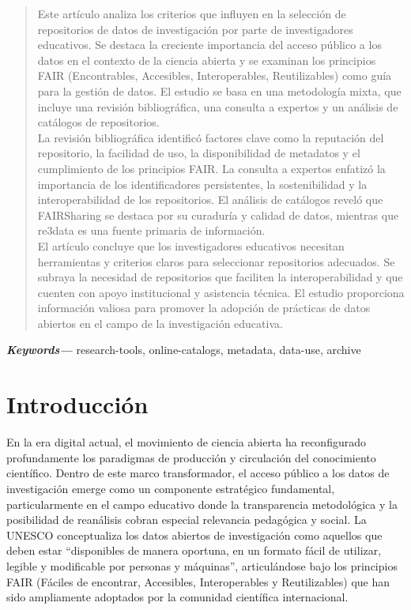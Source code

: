 \documentclass{article}
\providecommand{\keywords}[1]
{
  \small	
  \textbf{\textit{Keywords---}} #1
}
\begin{document}
\begin{abstract}
Este artículo analiza los criterios que influyen en la selección de repositorios de datos de investigación por parte de investigadores educativos. Se destaca la creciente importancia del acceso público a los datos en el contexto de la ciencia abierta y se examinan los principios FAIR (Encontrables, Accesibles, Interoperables, Reutilizables) como guía para la gestión de datos. El estudio se basa en una metodología mixta, que incluye una revisión bibliográfica, una consulta a expertos y un análisis de catálogos de repositorios.\\

La revisión bibliográfica identificó factores clave como la reputación del repositorio, la facilidad de uso, la disponibilidad de metadatos y el cumplimiento de los principios FAIR. La consulta a expertos enfatizó la importancia de los identificadores persistentes, la sostenibilidad y la interoperabilidad de los repositorios. El análisis de catálogos reveló que FAIRSharing se destaca por su curaduría y calidad de datos, mientras que re3data es una fuente primaria de información.\\

El artículo concluye que los investigadores educativos necesitan herramientas y criterios claros para seleccionar repositorios adecuados. Se subraya la necesidad de repositorios que faciliten la interoperabilidad y que cuenten con apoyo institucional y asistencia técnica. El estudio proporciona información valiosa para promover la adopción de prácticas de datos abiertos en el campo de la investigación educativa.\\

\end{abstract}

\keywords{research-tools, online-catalogs, metadata, data-use, archive}


\section{Introducción}

En la era digital actual, el movimiento de ciencia abierta ha reconfigurado profundamente los paradigmas de producción y circulación del conocimiento científico. Dentro de este marco transformador, el acceso público a los datos de investigación emerge como un componente estratégico fundamental, particularmente en el campo educativo donde la transparencia metodológica y la posibilidad de reanálisis cobran especial relevancia pedagógica y social. La UNESCO \cite[p.~10]{unesco2021} conceptualiza los datos abiertos de investigación como aquellos que deben estar ``disponibles de manera oportuna, en un formato fácil de utilizar, legible y modificable por personas y máquinas'', articulándose bajo los principios FAIR (Fáciles de encontrar, Accesibles, Interoperables y Reutilizables) que han sido ampliamente adoptados por la comunidad científica internacional.\\
\end{document}
